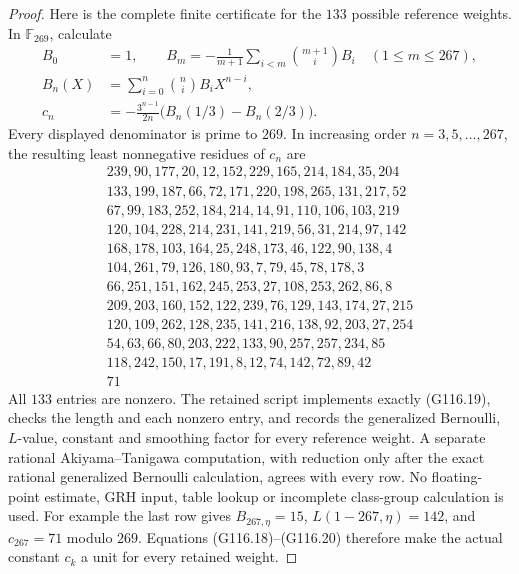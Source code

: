 \begin{proof}
Here is the complete finite certificate for the \(133\) possible
reference weights.  In \(\mathbb F_{269}\), calculate
\[
\begin{split}
 B_0&=1,\qquad
 B_m=-\frac1{m+1}\sum_{i<m}\binom{m+1}{i}B_i
                                      \quad(1\le m\le267),\\
 B_n(X)&=\sum_{i=0}^n\binom ni B_iX^{n-i},\\
 c_n&=-\frac{3^{n-1}}{2n}
                   \bigl(B_n(1/3)-B_n(2/3)\bigr).
\end{split}
 \tag{G116.19}
\]
Every displayed denominator is prime to \(269\).  In increasing
order \(n=3,5,\ldots,267\), the resulting least nonnegative
residues of \(c_n\) are
\[
\begin{gathered}
239,90,177,20,12,152,229,165,214,184,35,204\\
133,199,187,66,72,171,220,198,265,131,217,52\\
67,99,183,252,184,214,14,91,110,106,103,219\\
120,104,228,214,231,141,219,56,31,214,97,142\\
168,178,103,164,25,248,173,46,122,90,138,4\\
104,261,79,126,180,93,7,79,45,78,178,3\\
66,251,151,162,245,253,27,108,253,262,86,8\\
209,203,160,152,122,239,76,129,143,174,27,215\\
120,109,262,128,235,141,216,138,92,203,27,254\\
54,63,66,80,203,222,133,90,257,257,234,85\\
118,242,150,17,191,8,12,74,142,72,89,42\\
71
\end{gathered}
 \tag{G116.20}
\]
All \(133\) entries are nonzero.  The retained script implements
exactly (G116.19), checks the length and each nonzero entry,
and records the generalized Bernoulli, \(L\)-value, constant
and smoothing factor for every reference weight.
A separate rational Akiyama--Tanigawa computation, with
reduction only after the exact rational generalized Bernoulli
calculation, agrees with every row.  No floating-point estimate,
GRH input, table lookup or incomplete class-group calculation
is used.  For example the last row gives
\(B_{267,\eta}=15\), \(L(1-267,\eta)=142\), and \(c_{267}=71\)
modulo \(269\).  Equations (G116.18)--(G116.20) therefore make the
actual constant \(c_k\) a unit for every retained weight.


\end{proof}
